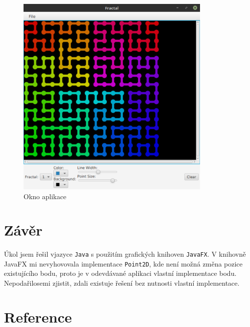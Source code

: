 \documentclass[12pt]{scrartcl}
\begin{document}
\begin{figure}[!ht]
	\centering
	\label{obr:polekolizi}
	\includegraphics[width=0.85\textwidth,natwidth=1,natheight=1]{app_gui.pdf}
	\caption{Okno aplikace}
\end{figure}

\newpage
\section{Závěr}
\paragraph{}
Úkol jsem řešil v\nobreakspace jazyce \texttt{Java} s použitím grafických knihoven \texttt{JavaFX}. V knihovně JavaFX mi nevyhovovala implementace \texttt{Point2D}, kde není možná změna pozice existujícího bodu, proto je v odevdávané aplikaci vlastní implementace bodu. Nepodařilo\nobreakspace se\nobreakspace mi zjistit, zdali existuje řešení bez nutnosti vlastní implementace.

\section{Reference}
\end{document}
